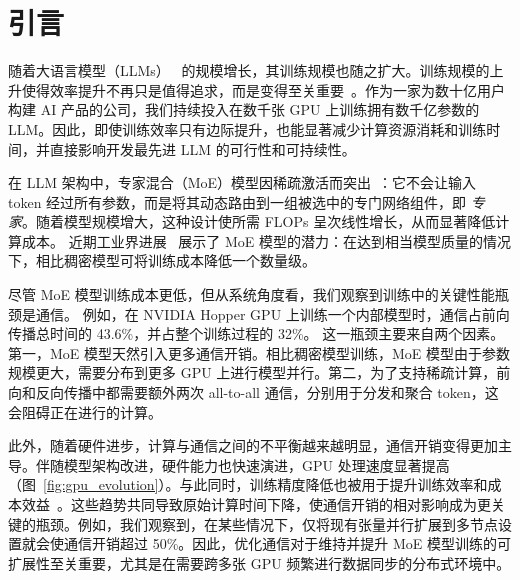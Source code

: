 \section{引言}
\label{sec:introduction}


随着大语言模型（LLMs）~\cite{chowdhery2023palm, touvron2023llama, jiang2024mixtral} 的规模增长，其训练规模也随之扩大。训练规模的上升使得效率提升不再只是值得追求，而是变得至关重要~\cite{jiang2024megascale}。作为一家为数十亿用户构建 AI 产品的公司，我们持续投入在数千张 GPU 上训练拥有数千亿参数的 LLM。因此，即使训练效率只有边际提升，也能显著减少计算资源消耗和训练时间，并直接影响开发最先进 LLM 的可行性和可持续性。

在 LLM 架构中，专家混合（MoE）模型因稀疏激活而突出~\cite{chowdhery2023palm, jiang2024mixtral, fedus2022switch, shazeer2017outrageously}：它不会让输入 token 经过所有参数，而是将其动态路由到一组被选中的专门网络组件，即 \emph{专家}。随着模型规模增大，这种设计使所需 FLOPs 呈次线性增长，从而显著降低计算成本。
近期工业界进展~\cite{google_GLaM, rajbhandari2022deepspeed, dbrx, grok, liu2024deepseekv3} 展示了 MoE 模型的潜力：在达到相当模型质量的情况下，相比稠密模型可将训练成本降低一个数量级。

尽管 MoE 模型训练成本更低，但从系统角度看，我们观察到训练中的关键性能瓶颈是通信。
例如，在 NVIDIA Hopper GPU 上训练一个内部模型时，通信占前向传播总时间的 43.6\%，并占整个训练过程的 32\%。
这一瓶颈主要来自两个因素。第一，MoE 模型天然引入更多通信开销。相比稠密模型训练，MoE 模型由于参数规模更大，需要分布到更多 GPU 上进行模型并行。第二，为了支持稀疏计算，前向和反向传播中都需要额外两次 all-to-all 通信，分别用于分发和聚合 token，这会阻碍正在进行的计算。

此外，随着硬件进步，计算与通信之间的不平衡越来越明显，通信开销变得更加主导。伴随模型架构改进，硬件能力也快速演进，GPU 处理速度显著提高（图~\ref{fig:gpu_evolution}）。与此同时，训练精度降低也被用于提升训练效率和成本效益~\cite{peng2023fp8, liu2024deepseekv3}。这些趋势共同导致原始计算时间下降，使通信开销的相对影响成为更关键的瓶颈。例如，我们观察到，在某些情况下，仅将现有张量并行扩展到多节点设置就会使通信开销超过 50\%。因此，优化通信对于维持并提升 MoE 模型训练的可扩展性至关重要，尤其是在需要跨多张 GPU 频繁进行数据同步的分布式环境中。


